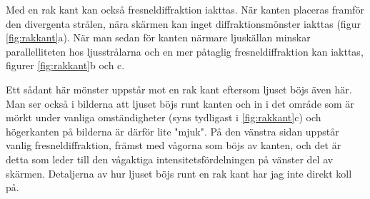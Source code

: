 \documentclass[a4paper]{article}
\begin{document}
Med en rak kant kan också fresneldiffraktion iakttas. När kanten placeras framför den divergenta strålen, nära skärmen kan inget diffraktionsmönster
iakttas (figur \ref{fig:rakkant}a). När man sedan för kanten närmare ljuskällan minskar parallelliteten hos ljusstrålarna och en mer påtaglig
fresneldiffraktion kan iakttas, figurer \ref{fig:rakkant}b och c.

Ett sådant här mönster uppstår mot en rak kant eftersom ljuset böjs även här. Man ser också i bilderna att ljuset böjs runt kanten och in i det område
som är mörkt under vanliga omständigheter (syns tydligast i \ref{fig:rakkant}c) och högerkanten på bilderna är därför lite "mjuk". På den vänstra sidan
uppstår vanlig fresneldiffraktion, främst med vågorna som böjs av kanten, och det är detta som leder till den vågaktiga intensitetsfördelningen på vänster
del av skärmen. Detaljerna av hur ljuset böjs runt en rak kant har jag inte direkt koll på.
\pagebreak
\end{document}
